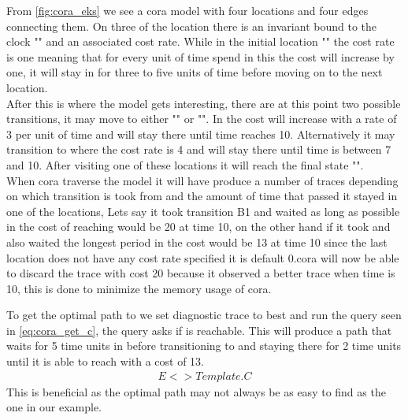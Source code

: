 From \cref{fig:cora_eks} we see a \gls{cora} model with four locations and four edges connecting them. On three of the location there is an invariant bound to the clock "" and an associated cost rate. While in the initial location "" the cost rate is one meaning that for every unit of time spend in this  the cost will increase by one, it will stay in  for three to five units of time before moving on to the next location.\\
After this is where the model gets interesting, there are at this point two possible transitions, it may move to either "" or "". In  the cost will increase with a rate of 3 per unit of time and will stay there until time reaches 10. Alternatively it may transition to  where the cost rate is 4 and will stay there until time is between 7 and 10. After visiting one of these locations it will reach the final state "". \\
When \gls{cora} traverse the model it will have produce a number of traces depending on which transition is took from  and the amount of time that passed it stayed in one of the locations, Lets say it took transition B1 and waited as long as possible in  the cost of reaching  would be 20 at time 10, on the other hand if it took  and also waited the longest period in  the cost would be 13 at time 10 since the last location does not have any cost rate specified it is default 0.\gls{cora} will now be able to discard the trace with cost 20 because it observed a better trace when time is 10, this is done to minimize the memory usage of \gls{cora}.

To get the optimal path to  we set diagnostic trace to best and run the query seen in \cref{eq:cora_get_c}, the query asks if  is reachable. This will produce a path that waits for 5 time units in  before transitioning to  and staying there for 2 time units until it is able to reach  with a cost of 13.
\begin{align}
E<> Template.C
\label{eq:cora_get_c}
\end{align}
This is beneficial as the optimal path may not always be as easy to find as the one in our example. 


